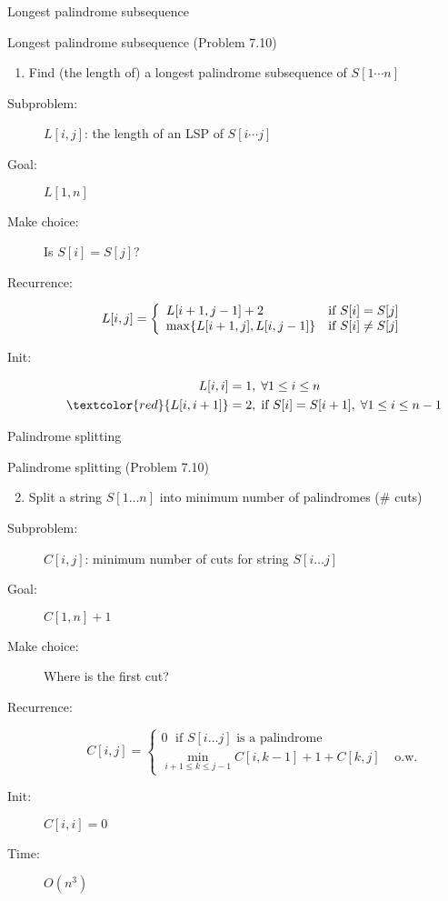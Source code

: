 \begin{frame}{Longest palindrome subsequence}
  \begin{exampleblock}{Longest palindrome subsequence (Problem 7.10)}
	\begin{enumerate}[(1)]
      \item Find (the length of) a longest palindrome subsequence of $S[1 \cdots n]$
    \end{enumerate}
  \end{exampleblock}

  \begin{description}
	\item[Subproblem:] $L[i,j]$: the length of an LSP of $S[i \cdots j]$
	\item[Goal:] $L[1,n]$
	  \pause
	\item[Make choice:] Is $S[i] = S[j]$?
	\item[Recurrence:] 
	  \begin{displaymath}
		L[i,j] = \left\{ \begin{array}{ll}
		  L[i+1, j-1] + 2 & \text{if } S[i] = S[j]  \\
		  \max\{L[i+1,j], L[i,j-1]\} & \text{if } S[i] \neq S[j]
		\end{array} \right.
	  \end{displaymath}
	  \pause
	\item[Init:]
	  \begin{align*}
		L[i,i] &= 1, \; \forall 1 \le i \le n  \\
		\textcolor{red}{L[i,i+1]} &= 2, \; \text{if } S[i] = S[i+1], \; \forall 1 \le i \le n-1
	  \end{align*}
  \end{description}
\end{frame}
\begin{frame}{Palindrome splitting}
  \begin{exampleblock}{Palindrome splitting (Problem 7.10)}
	\begin{enumerate}[(1)]
	  \setcounter{enumi}{1}
	  \item Split a string $S[1 \dots n]$ into minimum number of palindromes (\# cuts)
    \end{enumerate}
  \end{exampleblock}

  \begin{description}
	\item[Subproblem:] $C[i,j]$: minimum number of cuts for string $S[i \dots j]$
	\item[Goal:] $C[1,n] + 1$
	  \pause
	\item[Make choice:] Where is the first cut?
	\item[Recurrence:] 
	  \[
		C[i,j] = \left\{ \begin{array}{ll}
		  0	\; \text{ if } S[i \dots j] \text{ is a palindrome} & \\
		  \min\limits_{i+1 \le k \le j-1} C[i,k-1] + 1 + C[k,j] & \text{ o.w.}
		\end{array} \right.
	  \]
	  \pause
	\item[Init:] $C[i,i] = 0$
	\item[Time:] $O(n^3)$
  \end{description}
\end{frame}
